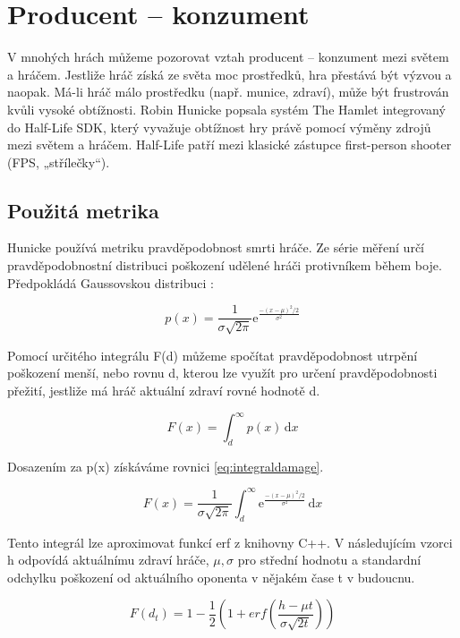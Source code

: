\section{Producent – konzument}

V mnohých hrách můžeme pozorovat vztah producent – konzument mezi světem a hráčem. Jestliže hráč získá ze světa moc prostředků, hra přestává být výzvou a naopak. Má-li hráč málo prostředku (např. munice, zdraví), může být frustrován kvůli vysoké obtížnosti.
Robin Hunicke popsala systém The Hamlet\cite{20Hun} integrovaný do Half-Life SDK\cite{hlsdk}, který vyvažuje obtížnost hry právě pomocí výměny zdrojů mezi světem a hráčem. Half-Life patří mezi klasické zástupce first-person shooter (FPS, „střílečky“).

\subsection{Použitá metrika}

Hunicke používá metriku pravděpodobnost smrti hráče. Ze série měření určí pravděpodobnostní distribuci poškození udělené hráči protivníkem během boje. Předpokládá Gaussovskou distribuci :

\begin{equation}
	   p(x)=\frac{1}{\sigma\sqrt{2\pi}}\mathrm{e}^{\frac{-(x-\mu)^2/2}{\sigma^2}}
\end{equation}

Pomocí určitého integrálu F(d) můžeme spočítat pravděpodobnost utrpění poškození menší, nebo rovnu d, kterou lze využít pro určení pravděpodobnosti přežití, jestliže má hráč aktuální zdraví rovné hodnotě d.

\begin{equation}
	   F(x) = \int_d^\infty p(x)\,\mathrm{d}x
\end{equation}

Dosazením za p(x) získáváme rovnici \ref{eq:integraldamage}.

\begin{equation} \label{eq:integraldamage}
	   F(x) = \frac{1}{\sigma\sqrt{2\pi}}\int_d^\infty \mathrm{e}^{\frac{-(x-\mu)^2/2}{\sigma^2}}\,\mathrm{d}x
\end{equation}

Tento integrál lze aproximovat funkcí erf z knihovny C++. V následujícím vzorci h odpovídá aktuálnímu zdraví hráče, $\mu, \sigma$ pro střední hodnotu a standardní odchylku poškození od aktuálního oponenta v nějakém čase t v budoucnu.

\begin{equation}
	   F(d_t) = 1-\frac{1}{2}(1+erf(\frac{h-\mu t}{\sigma\sqrt{2t}}))
\end{equation}

